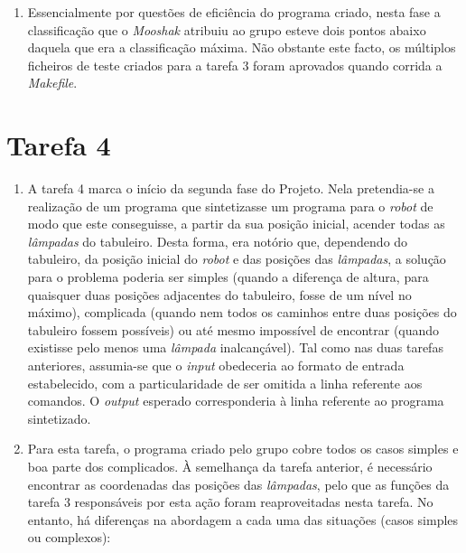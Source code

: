 \documentclass[12pt, a4paper]{article}
\begin{document}
\begin{enumerate}
\begin{enumerate} [i.]
\end{enumerate}

\item Essencialmente por questões de eficiência do programa criado, nesta fase a classificação que o \textit{Mooshak} atribuiu ao grupo esteve dois pontos abaixo daquela que era a classificação máxima. Não obstante este facto, os múltiplos ficheiros de teste criados para a tarefa 3 foram aprovados quando corrida a \textit{Makefile}.
\end{enumerate}

\section{Tarefa 4}

\begin{enumerate} 
   \item A tarefa 4 marca o início da segunda fase do Projeto. Nela pretendia-se a realização de um programa que sintetizasse um programa para o \textit{robot} de modo que este conseguisse, a partir da sua posição inicial, acender todas as \textit{lâmpadas} do tabuleiro. Desta forma, era notório que, dependendo do tabuleiro, da posição inicial do \textit{robot} e das posições das \textit{lâmpadas}, a solução para o problema poderia ser simples (quando a diferença de altura, para quaisquer duas posições adjacentes do tabuleiro, fosse de um nível no máximo), complicada (quando nem todos os caminhos entre duas posições do tabuleiro fossem possíveis) ou até mesmo impossível de encontrar (quando existisse pelo menos uma \textit{lâmpada} inalcançável). Tal como nas duas tarefas anteriores, assumia-se que o \textit{input} obedeceria ao formato de entrada estabelecido, com a particularidade de ser omitida a linha referente aos comandos. O \textit{output} esperado corresponderia à linha referente ao programa sintetizado.
  
  \item Para esta tarefa, o programa criado pelo grupo cobre todos os casos simples e boa parte dos complicados. À semelhança da tarefa anterior, é necessário encontrar as coordenadas das posições das \textit{lâmpadas}, pelo que as funções da tarefa 3 responsáveis por esta ação foram reaproveitadas nesta tarefa. No entanto, há diferenças na abordagem a cada uma das situações (casos simples ou complexos): 


\end{enumerate}
\end{document}
